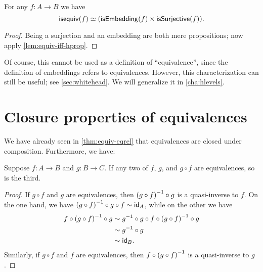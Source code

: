 \begin{cor}
  For any $f:A\to B$ we have
  \[ \isequiv(f) \eqvsym (\mathsf{isEmbedding}(f) \times \mathsf{isSurjective}(f)).\]
\end{cor}
\begin{proof}
  Being a surjection and an embedding are both mere propositions; now apply \cref{lem:equiv-iff-hprop}.
\end{proof}

Of course, this cannot be used as a definition of ``equivalence'', since the definition of embeddings refers to equivalences.
However, this characterization can still be useful; see \cref{sec:whitehead}.
We will generalize it in \cref{cha:hlevels}.


\section{Closure properties of equivalences}
\label{sec:equiv-closures}
\label{sec:fiberwise-equivalences}
%


We have already seen in \cref{thm:equiv-eqrel} that equivalences are closed under composition.
Furthermore, we have:

\begin{thm}\label{thm:two-out-of-three}
  Suppose $f:A\to B$ and $g:B\to C$.
  If any two of $f$, $g$, and $g\circ f$ are equivalences, so is the third.
\end{thm}
\begin{proof}
  If $g\circ f$ and $g$ are equivalences, then $\opp{(g\circ f)} \circ g$ is a quasi-inverse to $f$.
  On the one hand, we have $\opp{(g\circ f)} \circ g \circ f \htpy \idfunc[A]$, while on the other we have
  \begin{align*}
    f \circ \opp{(g\circ f)} \circ g
    &\htpy \opp g \circ g \circ f \circ \opp{(g\circ f)} \circ g\\
    &\htpy \opp g \circ g\\
    &\htpy \idfunc[B].
  \end{align*}
  Similarly, if $g\circ f$ and $f$ are equivalences, then $f\circ \opp{(g\circ f)}$ is a quasi-inverse to $g$.
\end{proof}

